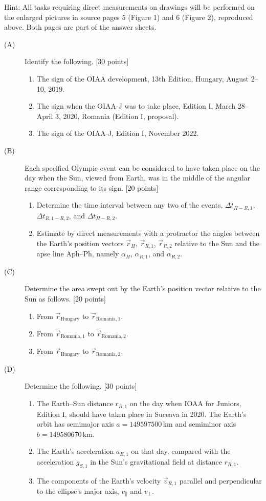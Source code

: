 Hint: All tasks requiring direct measurements on drawings will be performed
on the enlarged pictures in source pages 5 (Figure 1) and 6 (Figure 2),
reproduced above. Both pages are part of the answer sheets.
\begin{description}
\item[(A)] Identify the following. \hfill[30 points]
  \begin{enumerate}
  \item The sign of the OIAA development, 13th Edition, Hungary, August 2--10, 2019.
  \item The sign when the OIAA-J was to take place, Edition I, March 28--April 3,
    2020, Romania (Edition I, proposal).
  \item The sign of the OIAA-J, Edition I, November 2022.
  \end{enumerate}
\item[(B)] Each specified Olympic event can be considered to have taken place
  on the day when the Sun, viewed from Earth, was in the middle of the angular
  range corresponding to its sign. \hfill[20 points]
  \begin{enumerate}
  \item Determine the time interval between any two of the events,
    $\Delta t_{H-R,1}$, $\Delta t_{R,1-R,2}$, and $\Delta t_{H-R,2}$.
  \item Estimate by direct measurements with a protractor the angles between
    the Earth's position vectors $\vec r_H$, $\vec r_{R,1}$, $\vec r_{R,2}$
    relative to the Sun and the apse line Aph--Ph, namely $\alpha_H$,
    $\alpha_{R,1}$, and $\alpha_{R,2}$.
  \end{enumerate}
\item[(C)] Determine the area swept out by the Earth's position vector relative
  to the Sun as follows. \hfill[20 points]
  \begin{enumerate}
  \item From $\vec r_{\mathrm{Hungary}}$ to $\vec r_{\mathrm{Romania},1}$.
  \item From $\vec r_{\mathrm{Romania},1}$ to $\vec r_{\mathrm{Romania},2}$.
  \item From $\vec r_{\mathrm{Hungary}}$ to $\vec r_{\mathrm{Romania},2}$.
  \end{enumerate}
\item[(D)] Determine the following. \hfill[30 points]
  \begin{enumerate}
  \item The Earth--Sun distance $r_{R,1}$ on the day when IOAA for Juniors,
    Edition I, should have taken place in Suceava in 2020. The Earth's orbit
    has semimajor axis $a=149597500\,\mathrm{km}$ and semiminor axis
    $b=149580670\,\mathrm{km}$.
  \item The Earth's acceleration $a_{E,1}$ on that day, compared with the
    acceleration $g_{S,1}$ in the Sun's gravitational field at distance $r_{R,1}$.
  \item The components of the Earth's velocity $\vec v_{R,1}$ parallel and
    perpendicular to the ellipse's major axis, $v_\parallel$ and $v_\perp$.
  \end{enumerate}
\end{description}
